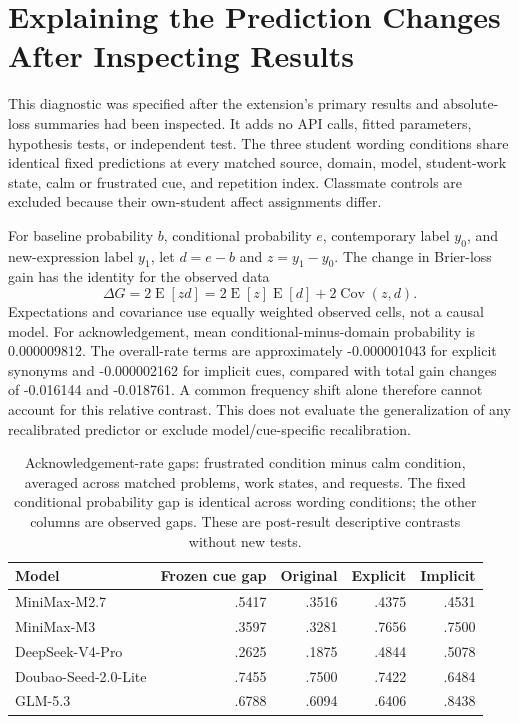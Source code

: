 \section{Explaining the Prediction Changes After Inspecting Results}
\label{app:cue-diagnosis}

This diagnostic was specified after the extension's primary results and
absolute-loss summaries had been inspected. It adds no API calls, fitted
parameters, hypothesis tests, or independent test. The three student
wording conditions share identical fixed predictions at every matched source,
domain, model, student-work state, calm or frustrated cue, and repetition index. Classmate controls
are excluded because their own-student affect assignments differ.

For baseline probability $b$, conditional probability $e$, contemporary label
$y_0$, and new-expression label $y_1$, let $d=e-b$ and $z=y_1-y_0$.
The change in Brier-loss gain has the identity for the observed data
\begin{equation}
\Delta G = 2\operatorname{E}[zd]
         = 2\operatorname{E}[z]\operatorname{E}[d] + 2\operatorname{Cov}(z,d).
\end{equation}
Expectations and covariance use equally weighted observed cells, not a causal
model. For acknowledgement, mean conditional-minus-domain probability is
0.000009812. The overall-rate terms are approximately -0.000001043 for explicit
synonyms and -0.000002162 for implicit cues, compared with total gain changes
of -0.016144 and -0.018761. A common frequency shift alone therefore cannot
account for this relative contrast. This does not evaluate the generalization
of any recalibrated predictor or exclude model/cue-specific recalibration.

\begin{table}[ht]
\centering\small
\begin{tabular}{lrrrr}
\toprule
Model & Frozen cue gap & Original & Explicit & Implicit\\
\midrule
MiniMax-M2.7 & .5417 & .3516 & .4375 & .4531\\
MiniMax-M3 & .3597 & .3281 & .7656 & .7500\\
DeepSeek-V4-Pro & .2625 & .1875 & .4844 & .5078\\
Doubao-Seed-2.0-Lite & .7455 & .7500 & .7422 & .6484\\
GLM-5.3 & .6788 & .6094 & .6406 & .8438\\
\bottomrule
\end{tabular}
\caption{Acknowledgement-rate gaps: frustrated condition minus calm condition, averaged
across matched problems, work states, and requests. The fixed conditional
probability gap is identical across wording conditions; the other columns are
observed gaps. These are post-result descriptive contrasts without new tests.}
\end{table}

